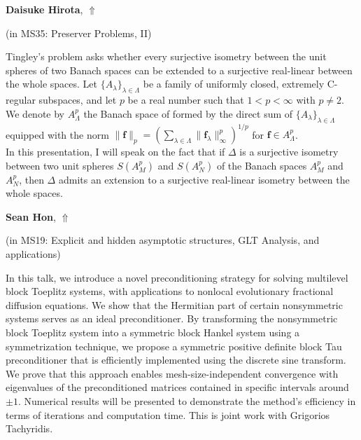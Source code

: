 \documentclass[ILAS2025-program.tex]{subfiles}
\begin{document}
     \hypertarget{down0248}{}\begin{ilasabstract}
    
    \textbf{Daisuke Hirota},  \hfill \hyperlink{up0248}{$\Uparrow$}
    
    (in {\color{mstitle}MS35: Preserver Problems, II})
        
        \mtskip
    Tingley's problem asks whether every surjective isometry between the unit spheres of two Banach spaces can be 
extended to a surjective real-linear  between the whole spaces. 
Let $\{A_{\lambda}\}_{\lambda\in\Lambda}$ be a family of uniformly closed, extremely C-regular subspaces,  
and 
let $p$ be a real number such that $1<p<\infty$ with $p\neq 2$. 
We denote by $A_{\Lambda}^{p}$ the Banach space of formed by the direct sum of $\{A_{\lambda}\}_{\lambda\in \Lambda}$ 
equipped with the norm $\|{\bm{f}}\|_{p}=\left(\sum_{\lambda\in \Lambda}\|{\bm{f}}_{\lambda}\|_{\infty}^{p}\right)^{1/p}$ for ${\bm{f}}\in A_{\Lambda}^{p}$. \\
\quad In this presentation, I will speak on the fact that
 if $\Delta$ is a surjective isometry between two unit spheres $S(A_{M}^{p})$ and $S(A_{N}^{p})$ of the Banach spaces 
 $A_{M}^{p}$ and $A_{N}^{p}$, 
 then $\Delta$ admits an extension to a surjective real-linear isometry between the whole spaces.\end{ilasabstract}
     \hypertarget{down0174}{}\begin{ilasabstract}
    
    \textbf{Sean Hon},  \hfill \hyperlink{up0174}{$\Uparrow$}
    
    (in {\color{mstitle}MS19: Explicit and hidden asymptotic structures, GLT Analysis, and applications})
        
        \mtskip
    In this talk, we introduce a novel preconditioning strategy for solving multilevel block Toeplitz systems, with applications to nonlocal evolutionary fractional diffusion equations. We show that the Hermitian part of certain nonsymmetric systems serves as an ideal preconditioner. By transforming the nonsymmetric block Toeplitz system into a symmetric block Hankel system using a symmetrization technique, we propose a symmetric positive definite block Tau preconditioner that is efficiently implemented using the discrete sine transform. We prove that this approach enables mesh-size-independent convergence with eigenvalues of the preconditioned matrices contained in specific intervals around $\pm 1$. Numerical results will be presented to demonstrate the method's efficiency in terms of iterations and computation time. This is joint work with Grigorios Tachyridis.\end{ilasabstract}
\end{document}
